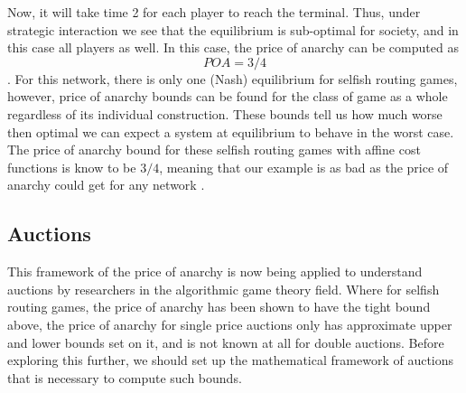 \documentclass[12pt,twoside]{reedthesis}
\begin{document}
Now, it will take time 2 for each player to reach the terminal. Thus, under strategic interaction we see that the equilibrium is sub-optimal for society, and in this case all players as well. In this case, the price of anarchy can be computed as $$POA = 3/4$$ \citep{Roughgarden2017}. For this network, there is only one (Nash) equilibrium for selfish routing games, however, price of anarchy bounds can be found for the class of game as a whole regardless of its individual construction. These bounds tell us how much worse then optimal we can expect a system at equilibrium to behave in the worst case. The price of anarchy bound for these selfish routing games with affine cost functions is know to be $3/4$, meaning that our example is as bad as the price of anarchy could get for any network \citep{Roughgarden2007}.

\subsection{Auctions}
This framework of the price of anarchy is now being applied to understand auctions by researchers in the algorithmic game theory field. Where for selfish routing games, the price of anarchy has been shown to have the tight bound above, the price of anarchy for single price auctions only has approximate upper and lower bounds set on it, and is not known at all for double auctions. Before exploring this further, we should set up the mathematical framework of auctions that is necessary to compute such bounds. 
\end{document}
